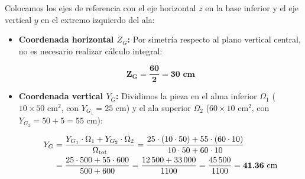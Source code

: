{\begin{center}
{%
}

    \end{center}



    \tcblower






    Colocamos los ejes de referencia con el eje horizontal $z$ en la base inferior y el eje vertical $y$ en el extremo izquierdo del ala:

    \begin{itemize}

        \item \textbf{Coordenada horizontal $Z_G$:} Por simetría respecto al plano vertical central, no es necesario realizar cálculo integral:

              \begin{equation}
                  \mathbf{Z_G = \frac{60}{2} = 30\text{ cm}}
\end{equation}

        \item \textbf{Coordenada vertical $Y_G$:} Dividimos la pieza en el alma inferior $\Omega_1$ ($10 \times 50\text{ cm}^2$, con $Y_{G_1} = 25\text{ cm}$) y el ala superior $\Omega_2$ ($60 \times 10\text{ cm}^2$, con $Y_{G_2} = 50 + 5 = 55\text{ cm}$):

              \begin{align}
                  Y_G & = \frac{Y_{G_1} \cdot \Omega_1 + Y_{G_2} \cdot \Omega_2}{\Omega_{\text{tot}}} = \frac{25 \cdot (10 \cdot 50) + 55 \cdot (60 \cdot 10)}{10 \cdot 50 + 60 \cdot 10} \notag \\
                      & = \frac{25 \cdot 500 + 55 \cdot 600}{500 + 600} = \frac{12\,500 + 33\,000}{1100} = \frac{45\,500}{1100} = \mathbf{41.36\text{ cm}}
\end{align}


\end{itemize}}
